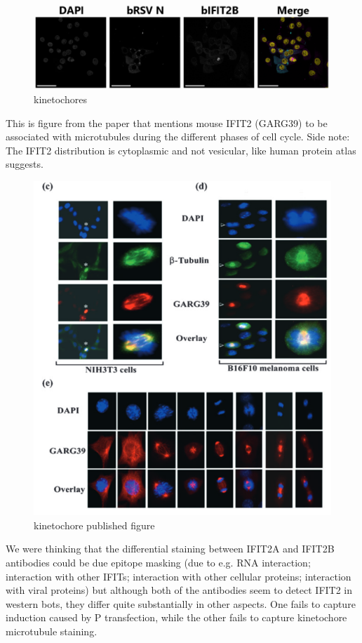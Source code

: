 \begin{figure}
    \centering
    \includegraphics[width=1\linewidth]{10. Chapter 5/Figs/05. IFIT2AB Discussion/03. kinetochores.png}
    \caption[kinetochores]{kinetochores}
    \label{fig:kinetochores}
\end{figure}

This is figure from the paper that mentions mouse IFIT2 (GARG39) to be associated with microtubules during the different phases of cell cycle.
Side note: The IFIT2 distribution is cytoplasmic and not vesicular, like human protein atlas suggests.

\begin{figure}
    \centering
    \includegraphics[width=1\linewidth]{10. Chapter 5/Figs/05. IFIT2AB Discussion/04. kinetochore published figure.png}
    \caption[kinetochore published figure]{kinetochore published figure}
    \label{fig:kinetochore published figure}
\end{figure}

We were thinking that the differential staining between IFIT2A and IFIT2B antibodies could be due epitope masking (due to e.g. RNA interaction; interaction with other IFITs; interaction with other cellular proteins; interaction with viral proteins) but although both of the antibodies seem to detect IFIT2 in western bots, they differ quite substantially in other aspects. One fails to capture induction caused by P transfection, while the other fails to capture kinetochore microtubule staining.